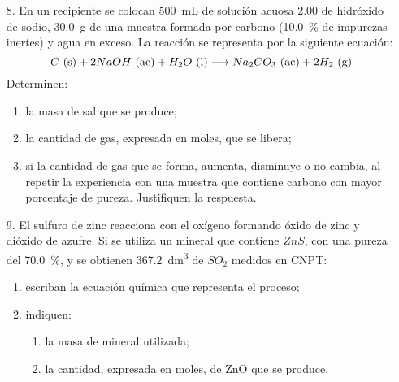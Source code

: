 \documentclass[../Práctica.root.tex]{subfiles}
\begin{document}
\begin{enumerate}
    \item[8.] En un recipiente se colocan \SI{500}{\mL} de solución acuosa \SI{2,00}{\MR} de hidróxido de sodio,
          \SI{30,0}{\g} de una muestra formada por carbono (\SI{10,0}{\percent} de impurezas inertes) y agua en
          exceso. La reacción se representa por la siguiente ecuación:
          \[ C \ \text{(s)} + 2 NaOH \ \text{(ac)} + H_2O \ \text{(l)} \longrightarrow{} Na_2CO_3 \ \text{(ac)} + 2 H_2 \ \text{(g)} \]
          Determinen:
          \begin{enumerate}
              \item la masa de sal que se produce;
              \item la cantidad de gas, expresada en moles, que se libera;
              \item si la cantidad de gas que se forma, aumenta, disminuye o no cambia, al repetir la experiencia con una muestra que contiene carbono con mayor porcentaje de pureza. Justifiquen la respuesta.
          \end{enumerate}


    \item[9.] El sulfuro de zinc reacciona con el oxígeno formando óxido de zinc y dióxido de azufre.
          Si se utiliza un mineral que contiene $ZnS$, con una pureza del \SI{70,0}{\percent}, y se obtienen
          \SI{367,2}{\dm\cubed} de $SO_2$ medidos en CNPT:
          \begin{enumerate}
              \item escriban la ecuación química que representa el proceso;
              \item indiquen:
                    \begin{enumerate}
                        \item la masa de mineral utilizada;
                        \item la cantidad, expresada en moles, de ZnO que se produce.
                    \end{enumerate}
          \end{enumerate}


\end{enumerate}
\end{document}

